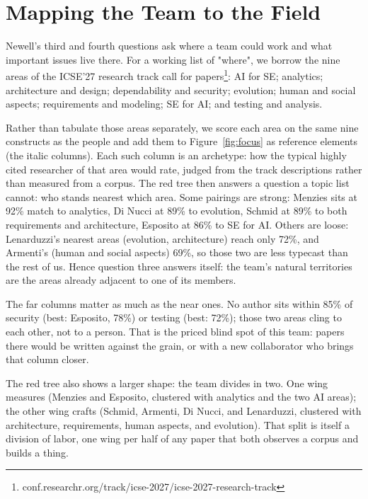 \section{Mapping the Team to the Field}
\label{sec:map}

Newell's third and fourth questions ask where a team could work and
what important issues live there.
For a working list of "where", we borrow the nine areas of the ICSE'27
research track call for
papers\footnote{conf.researchr.org/track/icse-2027/icse-2027-research-track}:
AI for SE; analytics; architecture and design; dependability and
security; evolution; human and social aspects; requirements and
modeling; SE for AI; and testing and analysis.

Rather than tabulate those areas separately, we score each area on the
same nine constructs as the people and add them to
Figure~\ref{fig:focus} as reference elements (the italic columns).
Each such column is an archetype: how the typical highly cited
researcher of that area would rate, judged from the track descriptions
rather than measured from a corpus.
 The red tree then
answers a question a topic list cannot: who stands nearest which area.
Some pairings are strong: Menzies sits at 92\% match to analytics, Di
Nucci at 89\% to evolution, Schmid at 89\% to both requirements and
architecture, Esposito at 86\% to SE for AI.
Others are loose: Lenarduzzi's nearest areas (evolution, architecture)
reach only 72\%, and Armenti's (human and social aspects) 69\%, so
those two are less typecast than the rest of us.
Hence question three answers itself: the team's natural territories
are the areas already adjacent to one of its members.

The far columns matter as much as the near ones.
No author sits within 85\% of security (best: Esposito, 78\%) or
testing (best: 72\%); those two areas cling to each other, not to a
person.
That is the priced blind spot of this team: papers there would be
written against the grain, or with a new collaborator who brings that
column closer.

The red tree also shows a larger shape: the team divides in two.
One wing measures (Menzies and Esposito, clustered with analytics and
the two AI areas); the other wing crafts (Schmid, Armenti, Di Nucci,
and Lenarduzzi, clustered with architecture, requirements, human
aspects, and evolution).
That split is itself a division of labor, one wing per half of any
paper that both observes a corpus and builds a thing.

